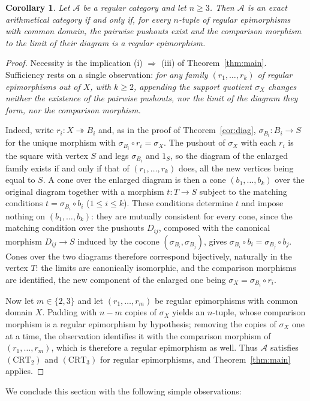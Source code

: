 \documentclass[11pt,a4paper]{article}
\theoremstyle{plain}
\newtheorem{corollaire}[theoreme]{Corollary}
\theoremstyle{definition}
\theoremstyle{remark}
\theoremstyle{plain}
\begin{document}
\begin{corollaire}\label{cor:nary}
Let $\mathcal{A}$ be a regular category and let $n \ge 3$. Then
$\mathcal{A}$ is an exact arithmetical category if and only if,
for every $n$-tuple of regular epimorphisms with common domain, the
pairwise pushouts exist and the comparison morphism to the limit of their
diagram is a regular epimorphism.
\end{corollaire}

\begin{proof}
Necessity is the implication (i) $\Rightarrow$ (iii) of
Theorem~\ref{thm:main}. Sufficiency rests on a single observation:
\emph{for any family $(r_1, \dots, r_k)$ of regular epimorphisms out of
$X$, with $k \ge 2$, appending the support quotient $\sigma_X$ changes
neither the existence of the pairwise pushouts, nor the limit of the
diagram they form, nor the comparison morphism.}

Indeed, write $r_i \colon X \twoheadrightarrow B_i$ and, as in the proof
of Theorem~\ref{cor:diag}, $\sigma_{B_i} \colon B_i \to S$ for the unique
morphism with $\sigma_{B_i} \circ r_i = \sigma_X$. The pushout of $\sigma_X$ with each $r_i$ is
the square with vertex $S$ and legs $\sigma_{B_i}$ and $1_S$, so the
diagram of the enlarged family exists if and only if that of
$(r_1, \dots, r_k)$ does, all the new vertices being equal to $S$. A cone
over the enlarged diagram is then a cone $(b_1, \dots, b_k)$ over the
original diagram together with a morphism $t \colon T \to S$ subject to
the matching conditions $t = \sigma_{B_i} \circ b_i$ ($1 \le i \le k$).
These conditions determine $t$ and impose nothing on
$(b_1, \dots, b_k)$: they are mutually consistent for every cone, since
the matching condition over the pushouts $D_{ij}$, composed with the canonical
morphism $D_{ij} \to S$ induced by the cocone
$(\sigma_{B_i}, \sigma_{B_j})$, gives
$\sigma_{B_i} \circ b_i = \sigma_{B_j} \circ b_j$. Cones over the two
diagrams therefore correspond bijectively, naturally in the vertex $T$:
the limits are canonically isomorphic, and the comparison morphisms are
identified, the new component of the enlarged one being
$\sigma_X = \sigma_{B_i} \circ r_i$.

Now let $m \in \{2, 3\}$ and let $(r_1, \dots, r_m)$ be regular
epimorphisms with common domain $X$. Padding with $n - m$ copies of
$\sigma_X$ yields an $n$-tuple, whose comparison morphism is a regular
epimorphism by hypothesis; removing the copies of $\sigma_X$ one at a
time, the observation identifies it with the comparison morphism of
$(r_1, \dots, r_m)$, which is therefore a regular epimorphism as well.
Thus $\mathcal{A}$ satisfies $(\mathrm{CRT}_2)$ and $(\mathrm{CRT}_3)$
for regular epimorphisms, and Theorem~\ref{thm:main} applies.
\end{proof}
We conclude this section with the following simple observations:
\end{document}
